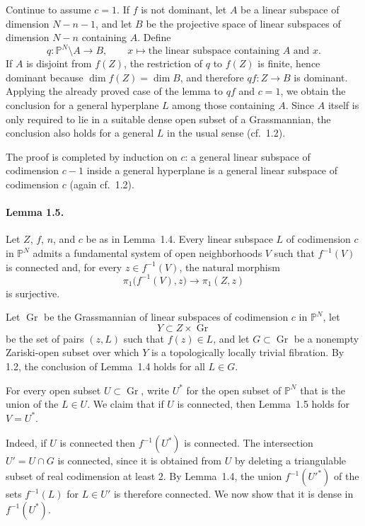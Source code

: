 \documentclass[11pt]{amsart}
\newcommand{\PP}{\mathbb{P}}
\begin{document}
Continue to assume $c=1$. If $f$ is not dominant, let $A$ be a linear subspace of dimension $N-n-1$, and let $B$ be the projective space of linear subspaces of dimension $N-n$ containing $A$. Define
\[
q\colon \PP^N\setminus A \to B,\qquad x\mapsto \text{the linear subspace containing }A\text{ and }x.
\]
If $A$ is disjoint from $f(Z)$, the restriction of $q$ to $f(Z)$ is finite, hence dominant because $\dim f(Z)=\dim B$, and therefore $qf\colon Z\to B$ is dominant. Applying the already proved case of the lemma to $qf$ and $c=1$, we obtain the conclusion for a general hyperplane $L$ among those containing $A$. Since $A$ itself is only required to lie in a suitable dense open subset of a Grassmannian, the conclusion also holds for a general $L$ in the usual sense (cf.~1.2).

The proof is completed by induction on $c$: a general linear subspace of codimension $c-1$ inside a general hyperplane is a general linear subspace of codimension $c$ (again cf.~1.2).

\paragraph{\textbf{Lemma 1.5.}}
Let $Z$, $f$, $n$, and $c$ be as in Lemma~1.4. Every linear subspace $L$ of codimension $c$ in $\PP^N$ admits a fundamental system of open neighborhoods $V$ such that $f^{-1}(V)$ is connected and, for every $z\in f^{-1}(V)$, the natural morphism
\[
\pi_1\bigl(f^{-1}(V),z\bigr)\to \pi_1(Z,z)
\]
is surjective.

Let $\operatorname{Gr}$ be the Grassmannian of linear subspaces of codimension $c$ in $\PP^N$, let
\[
Y\subset Z\times \operatorname{Gr}
\]
be the set of pairs $(z,L)$ such that $f(z)\in L$, and let $G\subset \operatorname{Gr}$ be a nonempty Zariski-open subset over which $Y$ is a topologically locally trivial fibration. By 1.2, the conclusion of Lemma~1.4 holds for all $L\in G$.

For every open subset $U\subset \operatorname{Gr}$, write $U^*$ for the open subset of $\PP^N$ that is the union of the $L\in U$. We claim that if $U$ is connected, then Lemma~1.5 holds for $V=U^*$.

Indeed, if $U$ is connected then $f^{-1}(U^*)$ is connected. The intersection $U'=U\cap G$ is connected, since it is obtained from $U$ by deleting a triangulable subset of real codimension at least $2$. By Lemma~1.4, the union $f^{-1}(U'^*)$ of the sets $f^{-1}(L)$ for $L\in U'$ is therefore connected. We now show that it is dense in $f^{-1}(U^*)$.
\end{document}
